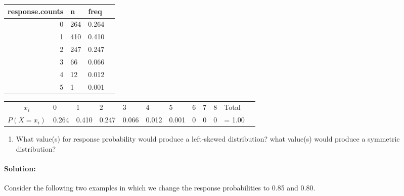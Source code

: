 \documentclass[11pt]{article}
\providecommand{\tightlist}{%
      \setlength{\itemsep}{0pt}\setlength{\parskip}{0pt}}
\begin{document}
    \begin{tabular}{r|lll}
 response.counts & n & freq\\
\hline
	 0     & 264   & 0.264\\
	 1     & 410   & 0.410\\
	 2     & 247   & 0.247\\
	 3     &  66   & 0.066\\
	 4     &  12   & 0.012\\
	 5     &   1   & 0.001\\
\end{tabular}


    
    \begin{longtable}[]{@{}clllllllllll@{}}
\toprule
\endhead
\(x_i\) & 0 & 1 & 2 & 3 & 4 & 5 & 6 & 7 & 8 & Total &\tabularnewline
\(P(X = x_i)\) & 0.264 & 0.410 & 0.247 & 0.066 & 0.012 & 0.001 & 0 & 0 &
0 & = 1.00 &\tabularnewline
\bottomrule
\end{longtable}

    \begin{enumerate}
\def\labelenumi{\alph{enumi})}
\setcounter{enumi}{3}
\tightlist
\item
  What value(s) for response probability would produce a left-skewed
  distribution? what value(s) would produce a symmetric distribution?
\end{enumerate}

    \hypertarget{solution}{%
\paragraph{Solution:}\label{solution}}

Consider the following two examples in which we change the response
probabilities to 0.85 and 0.80.
\end{document}
